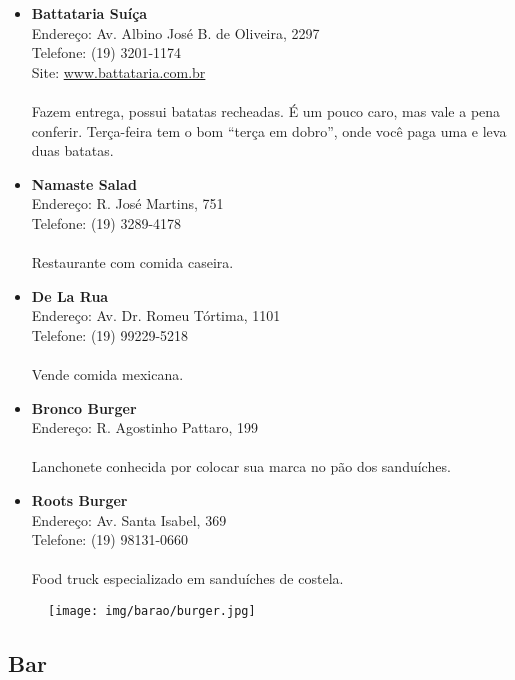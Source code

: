 \begin{itemize}
\item \textbf{Battataria Suíça}
  \\Endereço: Av. Albino José B. de Oliveira, 2297
  \\Telefone: (19) 3201-1174
  \\Site: \url{www.battataria.com.br}
  \\
  \\Fazem entrega, possui batatas recheadas. É um pouco caro, mas vale a pena
  conferir. Terça-feira tem o bom ``terça em dobro'', onde você paga uma e leva
  duas batatas.

\item \textbf{Namaste Salad}
  \\Endereço: R. José Martins, 751
  \\Telefone: (19) 3289-4178
  \\
  \\Restaurante com comida caseira.

\item \textbf{De La Rua}
  \\Endereço: Av. Dr. Romeu Tórtima, 1101
  \\Telefone: (19) 99229-5218
  \\
  \\Vende comida mexicana.

\item \textbf{Bronco Burger}
  \\Endereço: R. Agostinho Pattaro, 199
  \\
  \\Lanchonete conhecida por colocar sua marca no pão dos sanduíches.

\item \textbf{Roots Burger}
  \\Endereço: Av. Santa Isabel, 369
  \\Telefone: (19) 98131-0660
  \\
  \\Food truck especializado em sanduíches de costela.
\end{itemize}

\begin{figure}[h!]
  \centering
  \texttt{[image: img/barao/burger.jpg]}
\end{figure}

\subsection{Bar}

